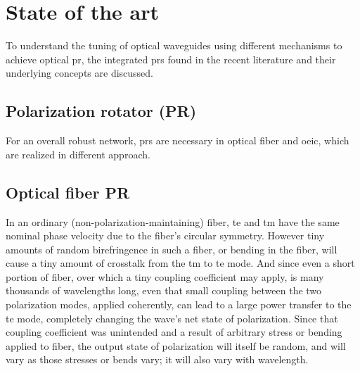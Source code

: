 \documentclass[../report.tex]{subfiles}
\begin{document}
	
	
\chapter{State of the art}
To understand the tuning of optical waveguides using different mechanisms to achieve optical \gls{pr}, the integrated \gls{pr}s found in the recent literature and their underlying concepts are discussed. 
			
	\section{Polarization rotator (PR)}	
For an overall robust network, \gls{pr}s are necessary in optical fiber and \gls{oeic}, which are realized in different approach.	

	\section{Optical fiber PR}	
In an ordinary (non-polarization-maintaining) fiber, \gls{te} and \gls{tm} have the same nominal phase velocity due to the fiber's circular symmetry. However tiny amounts of random birefringence in such a fiber, or bending in the fiber, will cause a tiny amount of crosstalk from the \gls{tm} to \gls{te} mode. And since even a short portion of fiber, over which a tiny coupling coefficient may apply, is many thousands of wavelengths long, even that small coupling between the two polarization modes, applied coherently, can lead to a large power transfer to the \gls{te} mode, completely changing the wave's net state of polarization. Since that coupling coefficient was unintended and a result of arbitrary stress or bending applied to fiber, the output state of polarization will itself be random, and will vary as those stresses or bends vary; it will also vary with wavelength.\par
\end{document}
